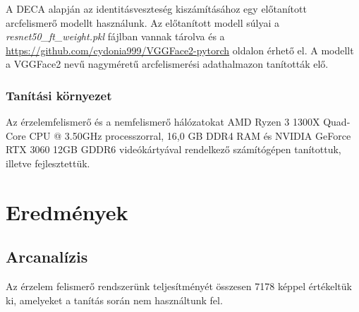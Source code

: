 \documentclass[12pt,a4]{article}
\begin{document}
    A DECA alapján az identitásveszteség kiszámításához egy előtanított arcfelismerő modellt használunk. Az előtanított modell súlyai a \textit{resnet50\_ft\_weight.pkl} fájlban vannak tárolva és a \url{https://github.com/cydonia999/VGGFace2-pytorch} oldalon érhető el.
    A modellt a VGGFace2 nevű nagyméretű arcfelismerési adathalmazon tanították elő.

    \subsubsection{Tanítási környezet}

        Az érzelemfelismerő és a nemfelismerő hálózatokat AMD Ryzen 3 1300X Quad-Core CPU @ 3.50GHz processzorral, 16,0 GB DDR4 RAM és NVIDIA GeForce RTX 3060 12GB GDDR6 videókártyával rendelkező számítógépen tanítottuk, illetve fejlesztettük.
    
    \section{Eredmények}
 	      \subsection{Arcanalízis}

            Az érzelem felismerő rendszerünk teljesítményét összesen 7178 képpel értékeltük ki, amelyeket a tanítás során nem használtunk fel.
\end{document}
